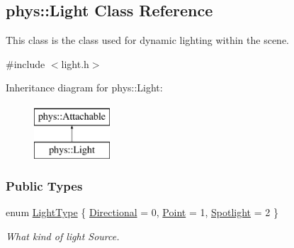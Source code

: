 \hypertarget{classphys_1_1Light}{
\subsection{phys::Light Class Reference}
\label{classphys_1_1Light}
}


This class is the class used for dynamic lighting within the scene.  




{\ttfamily \#include $<$light.h$>$}

Inheritance diagram for phys::Light:\begin{figure}[H]
\begin{center}
\leavevmode
\includegraphics[height=2.000000cm]{classphys_1_1Light}
\end{center}
\end{figure}
\subsubsection*{Public Types}
\begin{DoxyCompactItemize}
\item 
enum \hyperlink{classphys_1_1Light_aef1be63d57f59f33bf4c66be797009bf}{LightType} \{ \hyperlink{classphys_1_1Light_aef1be63d57f59f33bf4c66be797009bfac3ba7607dde18593ca9c727b0baf81e3}{Directional} =  0, 
\hyperlink{classphys_1_1Light_aef1be63d57f59f33bf4c66be797009bfa8030594658d86b56e82ac4e4233eeb63}{Point} =  1, 
\hyperlink{classphys_1_1Light_aef1be63d57f59f33bf4c66be797009bfa8b7e7aa3e44d03789a35c40947e99f3a}{Spotlight} =  2
 \}
\begin{DoxyCompactList}\small\item\em What kind of light Source. \item\end{DoxyCompactList}\end{DoxyCompactItemize}
